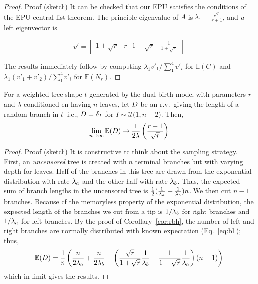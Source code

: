 \begin{proof}{Proof (sketch)}
It can be checked that our \gls{EPU} satisfies the conditions of the \gls{EPU} central list theorem. The principle eigenvalue of $A$ is $\lambda_1=\frac{\sqrt{r}}{r+1}$, and \textit{a} left eigenvector is

\begin{small}
$$
v'= 
\begin{bmatrix}1+\sqrt{r}& r&  1+\sqrt{r}& \frac{1}{1+\sqrt{r}}
\end{bmatrix}$$
\end{small} 

The results immediately follow by computing $\lambda_1v'_1/\sum_1^4 v'_i$ for $\mathbb{E}(C)$ and $\lambda_1(v'_1+v'_2)/\sum_1^4 v'_i$ for $\mathbb{E}(N_r)$.
\end{proof}

\begin{theorem}
For a weighted tree shape $t$ generated by the dual-birth model with parameters $r$ and $\lambda$ conditioned on having $n$ leaves, let $D$ be an r.v.\ giving the length of a random branch in $t$; i.e., $D=\delta_I$ for $I\sim\mathcal{U}(1,n-2$). Then, 
\begin{align}\label{sup:eq:bl} %
\lim_{n\to\infty}\mathbb{E}(\BL) \to \frac{1}{2\lambda}\left(\frac{r+1}{\sqrt{r}}\right)
\end{align}
\end{theorem}

\begin{proof}{Proof (sketch)}
It is constructive to think about the sampling strategy. First, an \textit{uncensored} tree is created with $n$ terminal branches but with varying depth for leaves. Half of the branches in this tree are drawn from the exponential distribution with rate $\lambda_a$ and the other half with rate $\lambda_b$. Thus, the expected sum of branch lengths in the uncensored tree is $\frac{1}{2}(\frac{1}{\lambda_a}+\frac{1}{\lambda_b})n$. We then cut $n-1$ branches. Because of the memoryless property of the exponential distribution, the expected length of the branches we cut from a tip is $1/\lambda_b$ for right branches and $1/\lambda_a$ for left branches. By the proof of Corollary~\ref{cor:rbh}, the number of left and right branches are normally distributed with known expectation (Eq.~\ref{eq:bl}); thus,
$$
\mathbb{E}(D)=
\frac{1}{n}\left(\frac{n}{2\lambda_a}+\frac{n}{2\lambda_b}-\left(\frac{\sqrt{r}}{1+\sqrt{r}}\frac{1}{\lambda_b}+\frac{1}{1+\sqrt{r}}\frac{1}{\lambda_a}\right)(n-1)\right)
$$
which in limit gives the results. 
\end{proof}

